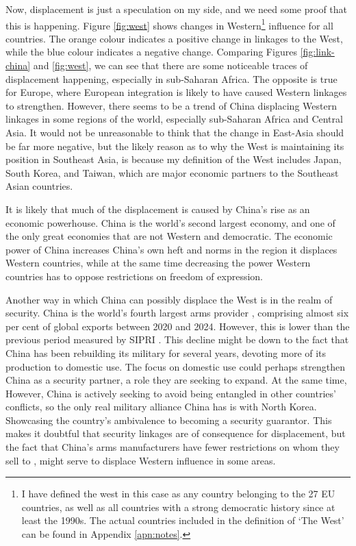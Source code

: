 Now, displacement is just a speculation on my side, and we need some proof that this is happening. Figure \ref{fig:west} shows changes in Western\footnote{I have defined the west in this case as any country belonging to the 27 EU countries, as well as all countries with a strong democratic history since at least the 1990s. The actual countries included in the definition of `The West' can be found in Appendix \ref{apn:notes}.} influence for all countries. The orange colour indicates a positive change in linkages to the West, while the blue colour indicates a negative change. Comparing Figures \ref{fig:link-china} and \ref{fig:west}, we can see that there are some noticeable traces of displacement happening, especially in sub-Saharan Africa. The opposite is true for Europe, where European integration is likely to have caused Western linkages to strengthen. However, there seems to be a trend of China displacing Western linkages in some regions of the world, especially sub-Saharan Africa and Central Asia. It would not be unreasonable to think that the change in East-Asia should be far more negative, but the likely reason as to why the West is maintaining its position in Southeast Asia, is because my definition of the West includes Japan, South Korea, and Taiwan, which are major economic partners to the Southeast Asian countries. 

It is likely that much of the displacement is caused by China's rise as an economic powerhouse. China is the world's second largest economy, and one of the only great economies that are not Western and democratic. The economic power of China increases China's own heft and norms in the region it displaces Western countries, while at the same time decreasing the power Western countries has to oppose restrictions on freedom of expression. 

Another way in which China can possibly displace the West is in the realm of security. China is the world's fourth largest arms provider \citep{george_trends_2025, gunter_chinas_2024}, comprising almost six per cent of global exports between 2020 and 2024. However, this is lower than the previous period measured by SIPRI \citep{george_trends_2025}. This decline might be down to the fact that China has been rebuilding its military for several years, devoting more of its production to domestic use. The focus on domestic use could perhaps strengthen China as a security partner, a role they are seeking to expand. At the same time, However, China is actively seeking to avoid being entangled in other countries' conflicts, so the only real military alliance China has is with North Korea. Showcasing the country's ambivalence to becoming a security guarantor. This makes it doubtful that security linkages are of consequence for displacement, but the fact that China's arms manufacturers have fewer restrictions on whom they sell to \citep{gunter_chinas_2024}, might serve to displace Western influence in some areas.

